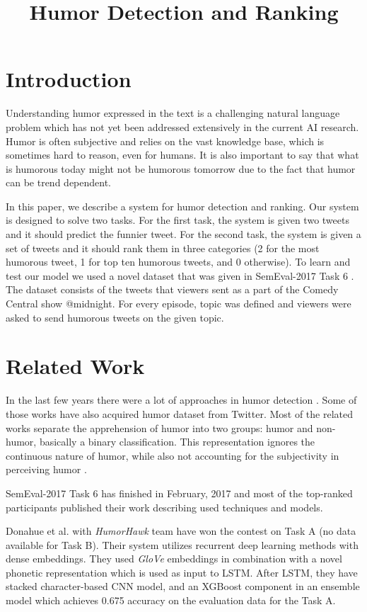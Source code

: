 \documentclass[10pt, a4paper]{article}
\title{Humor Detection and Ranking}
\begin{document}
\maketitleabstract

\section{Introduction}

Understanding humor expressed in the text is a challenging natural language problem which has not yet been addressed extensively in the current AI research. Humor is often subjective and relies on the vast knowledge base, which is sometimes hard to reason, even for humans. It is also important to say that what is humorous today might not be humorous tomorrow due to the fact that humor can be trend dependent.

In this paper, we describe a system for humor detection and
ranking. Our system is designed to solve two tasks. For the first task, the
system is given two tweets and it should predict the funnier tweet.
For the second task, the system is given a set of tweets and it should rank them
in three categories (2 for the most humorous tweet, 1 for top ten humorous
tweets, and 0 otherwise). To learn and test our model we used a novel dataset that was
given in SemEval-2017 Task 6 \citep{potash2016hashtagwars}. The dataset consists of
the tweets that viewers sent as a part of the Comedy Central show @midnight. For every
episode, topic was defined and viewers were asked to send humorous
tweets on the given topic.

\section{Related Work}

In the last few years there were a lot of approaches in humor detection \citep{mihalcea2005,reyes2013,zhang2014,barbieri2014,yang2015}.
Some of those works \citep{reyes2013,zhang2014,barbieri2014} have also acquired
humor dataset from Twitter. Most of the related works separate the apprehension 
of humor into two groups: humor and non-humor, basically a binary classification.
This representation ignores the continuous nature of humor, while also not accounting
for the subjectivity in perceiving humor \citep{potash2016hashtagwars}.

SemEval-2017 Task 6 has finished in February, 2017 and most of the top-ranked participants \citep{humorhawk2017,takelab2017,datastories2017} published their work describing used techniques and models.

Donahue et al. with \emph{HumorHawk} team have won the contest on Task A (no data available for Task B). Their system utilizes recurrent deep learning methods with dense embeddings. They used \emph{GloVe} embeddings in combination with a novel phonetic representation which is used as input to LSTM. After LSTM, they have stacked character-based CNN model, and an XGBoost \citep{XGBoost2016} component in an ensemble model which achieves 0.675 accuracy on the evaluation data for the Task A.
\end{document}
